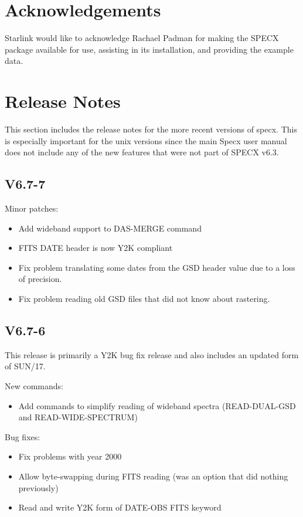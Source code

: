 \documentclass[twoside,11pt]{article}
\renewcommand{\_}{\texttt{\symbol{95}}}
\begin{document}
\section{Acknowledgements}

Starlink would like to acknowledge Rachael Padman for making
the SPECX package available for use, assisting in its installation,
and providing the example data.

\appendix

\section{Release Notes}

This section includes the release notes for the more recent versions
of specx. This is especially important for the unix versions since
the main Specx user manual does not include any of the new features
that were not part of SPECX v6.3.

\subsection{V6.7-7}

Minor patches:

\begin{itemize}
\item Add wideband support to DAS-MERGE command
\item FITS DATE header is now Y2K compliant
\item Fix problem translating some dates from the GSD header value due to a loss of  precision.
\item Fix problem reading old GSD files that did not know about rastering.
\end{itemize}

\subsection{V6.7-6}

This release is primarily a Y2K bug fix release and also includes an
updated form of SUN/17.

\begin{description}

\item New commands:
\begin{itemize}
\item Add commands to simplify reading of wideband spectra (READ-DUAL-GSD and
READ-WIDE-SPECTRUM)
\end{itemize}
\item Bug fixes:
\begin{itemize}
\item Fix problems with year 2000
\item Allow byte-swapping during FITS reading (was an option that
    did nothing previously)
\item Read and write Y2K form of DATE-OBS FITS keyword
\end{itemize}
\end{description}
\end{document}
